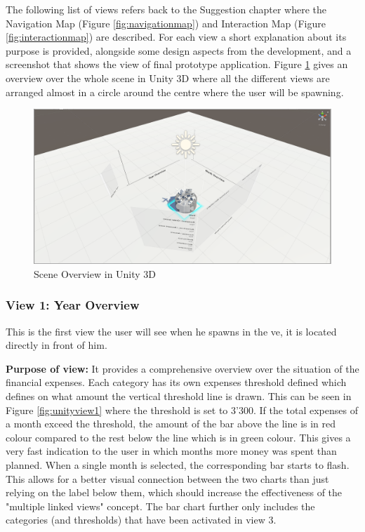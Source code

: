 The following list of views refers back to the Suggestion chapter where the Navigation Map (Figure \ref{fig:navigationmap}) and Interaction Map (Figure \ref{fig:interactionmap}) are described. For each view a short explanation about its purpose is provided, alongside some design aspects from the development, and a screenshot that shows the view of final prototype application. Figure \ref{fig:unityoverview} gives an overview over the whole scene in Unity 3D where all the different views are arranged almost in a circle around the centre where the user will be spawning.

\begin{figure}[h]
	\begin{center}
		\includegraphics[width=12cm]{03_Figures/08_Development/Unity_Overview.png}
		\caption{Scene Overview in Unity 3D}
		\label{fig:unityoverview}
	\end{center}
\end{figure}

\subsubsection{View 1: Year Overview}

This is the first view the user will see when he spawns in the \gls{ve}, it is located directly in front of him.

\textbf{Purpose of view:} It provides a comprehensive overview over the situation of the financial expenses. Each category has its own expenses threshold defined which defines on what amount the vertical threshold line is drawn. This can be seen in Figure \ref{fig:unityview1} where the threshold is set to 3'300. If the total expenses of a month exceed the threshold, the amount of the bar above the line is in red colour compared to the rest below the line which is in green colour. This gives a very fast indication to the user in which months more money was spent than planned. When a single month is selected, the corresponding bar starts to flash. This allows for a better visual connection between the two charts than just relying on the label below them, which should increase the effectiveness of the "multiple linked views" concept. The bar chart further only includes the categories (and thresholds) that have been activated in view 3.

